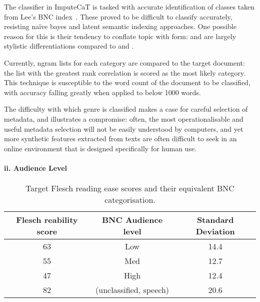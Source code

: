The classifier in ImputeCaT is tasked with accurate identification of classes taken from Lee's BNC index~\cite{lee2001genres}.  These proved to be difficult to classify accurately, resisting na\"ive bayes and latent semantic indexing approaches.  One possible reason for this is their tendency to conflate topic with form:  and  are largely stylistic differentiations compared to  and .

Currently, ngram lists for each category are compared to the target document: the list with the greatest rank correlation is scored as the most likely category.  This technique is susceptible to the word count of the document to be classified, with accuracy falling greatly when applied to below 1000 words.  


The difficulty with which genre is classified makes a case for careful selection of metadata, and illustrates a compromise: often, the most operationalisable and useful metadata selection will not be easily understood by computers, and yet more synthetic features extracted from texts are often difficult to seek in an online environment that is designed specifically for human use.


\paragraph{ii. Audience Level}

\begin{table}[h]
    \center
    \begin{tabular}{|c|c|c|}
        \hline 
        Flesch reability score & BNC Audience level & Standard Deviation \\
        \hline 
        63 & Low & 14.4\\
        55 & Med & 12.7 \\
        47 & High & 12.4\\
        82 & (unclassified, speech) & 20.6 \\
        \hline
    \end{tabular}
    \caption{Target Flesch reading ease scores and their equivalent BNC categorisation.}
    \label{tab:rebuilding:method:fscore}
\end{table}


